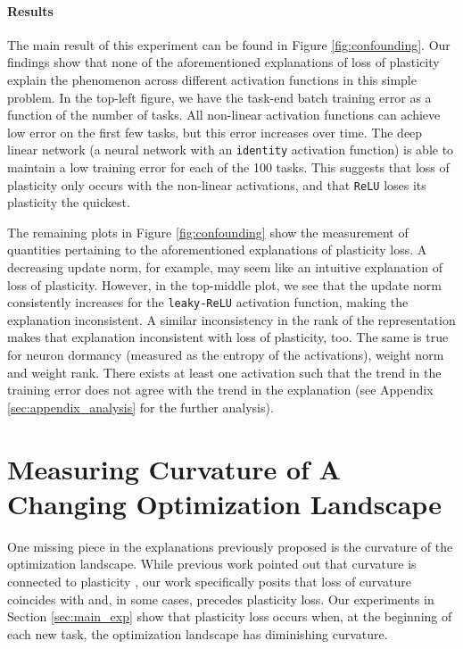 \documentclass{article}
\begin{document}
\paragraph{Results}
The main result of this experiment can be found in Figure \ref{fig:confounding}.
Our findings show that none of the aforementioned explanations of loss of plasticity explain the phenomenon across different activation functions in this simple problem.
In the top-left figure, we have the task-end batch training error as a function of the number of tasks. All non-linear activation functions can achieve low error on the first few tasks, but this error increases over time.
The deep linear network (a neural network with an \texttt{identity} activation function) is able to maintain a low training error for each of the 100 tasks.
This suggests that loss of plasticity only occurs with the non-linear activations, and that \texttt{ReLU} loses its plasticity the quickest.

The remaining plots in Figure \ref{fig:confounding} show the measurement of quantities pertaining to the aforementioned explanations of plasticity loss.
A decreasing update norm, for example, may seem like an intuitive explanation of loss of plasticity.
However, in the top-middle plot, we see that the update norm consistently increases for the \texttt{leaky-ReLU} activation function, making the explanation inconsistent.
A similar inconsistency in the rank of the representation makes that explanation inconsistent with loss of plasticity, too.
The same is true for neuron dormancy (measured as the entropy of the activations), weight norm and weight rank.
There exists at least one activation such that the trend in the training error does not agree with the trend in the explanation (see Appendix \ref{sec:appendix_analysis} for the further analysis).


\section{Measuring Curvature of A Changing Optimization Landscape}
\vspace{-2mm}

One missing piece in the explanations previously proposed is the curvature of the optimization landscape.
While previous work pointed out that curvature is connected to plasticity \citep{lyle23_under}, our work specifically posits that loss of curvature coincides with and, in some cases, precedes plasticity loss.
Our experiments in Section \ref{sec:main_exp} show that plasticity loss occurs when, at the beginning of each new task, the optimization landscape has diminishing curvature.
\end{document}
